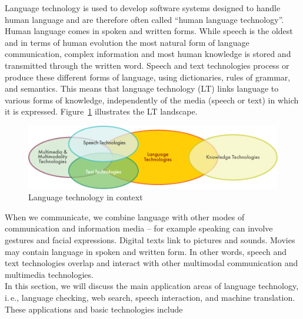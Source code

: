 \documentclass[]{../../metanetpaper}
\begin{document}
\clearpage


\begin{multicols}{2}

Language technology is used to develop software systems designed to handle human language and are therefore often called “human language technology”. Human language comes in spoken and written forms. While speech is the oldest and in terms of human evolution the most natural form of language communication, complex information and most human knowledge is stored and transmitted through the written word. Speech and text technologies process or produce these different forms of language, using dictionaries, rules of grammar, and semantics. This means that language technology (LT) links language to various forms of knowledge, independently of the media (speech or text) in which it is expressed. Figure~\ref{fig:ltincontext_en} illustrates the LT landscape.

\begin{figure}[htb]
  \center
  \includegraphics[width=\textwidth]{../_media/english/language_technologies}
  \caption{Language technology in context}
  \label{fig:ltincontext_en}
\end{figure}

When we communicate, we combine language with other modes of communication and information media – for example speaking can involve gestures and facial expressions. Digital texts link to pictures and sounds. Movies may contain language in spoken and written form. In other words, speech and text technologies overlap and interact with other multimodal communication and multimedia technologies.\\ 
In this section, we will discuss the main application areas of language technology, i.\,e., language checking, web search, speech interaction, and machine translation. These applications and basic technologies include 


\end{multicols}
\end{document}
